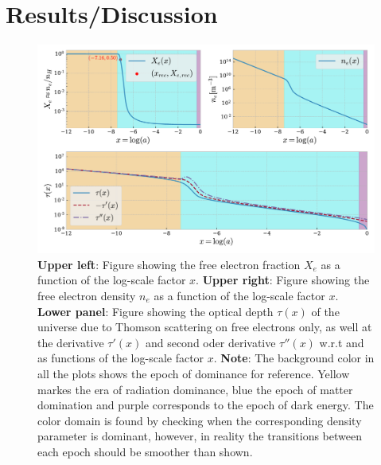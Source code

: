 \documentclass[twocolumn]{aastex62}
\begin{document}
\section{Results/Discussion}\label{sec:Results}

\begin{figure}
    \includegraphics[scale = 0.65]{Figures/Xe_ne_tau.pdf}
    \caption{\textbf{Upper left}: Figure showing the free electron fraction $X_e$ 
    as a function of the log-scale factor $x$. \textbf{Upper right}: Figure showing the free electron density $n_e$
    as a function of the log-scale factor $x$. \textbf{Lower panel}: Figure showing the optical depth $\tau(x)$ of the universe due to 
    Thomson scattering on free electrons only, as well at the derivative $\tau'(x)$ and second oder derivative $\tau''(x)$ w.r.t 
    and as functions of the log-scale factor $x$. \textbf{Note}: The background color in all the plots shows the epoch of dominance
    for reference. Yellow markes the era of radiation dominance, blue the epoch of matter domination
    and purple corresponds to the epoch of dark energy. The color domain is found by checking 
    when the corresponding density parameter is dominant,
    however, in reality the transitions between each epoch should be smoother than shown.}
    \label{fig:Xe}
\end{figure}
\end{document}
